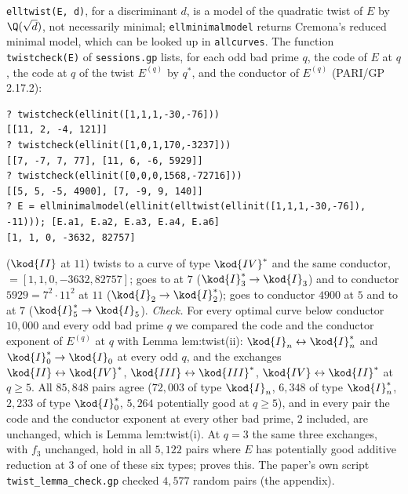 \begin{sloppypar}
\begin{example}\label{ex:computation:twists}
\texttt{elltwist(E, d)}, for a discriminant $d$, is a model of the quadratic twist of $E$ by $\Q(\sqrt d)$, not necessarily minimal;
\texttt{ellminimalmodel} returns Cremona's reduced minimal model, which can be looked up in \texttt{allcurves}. The function
\texttt{twistcheck(E)} of \texttt{sessions.gp} lists, for each odd bad prime $q$, the code of $E$ at $q$, the code at $q$ of the twist $E^{(q)}$ by
$q^*$, and the conductor of $E^{(q)}$ (PARI/GP 2.17.2):
\begin{lstlisting}[language=GP]
? twistcheck(ellinit([1,1,1,-30,-76]))
[[11, 2, -4, 121]]
? twistcheck(ellinit([1,0,1,170,-3237]))
[[7, -7, 7, 77], [11, 6, -6, 5929]]
? twistcheck(ellinit([0,0,0,1568,-72716]))
[[5, 5, -5, 4900], [7, -9, 9, 140]]
? E = ellminimalmodel(ellinit(elltwist(ellinit([1,1,1,-30,-76]), -11))); [E.a1, E.a2, E.a3, E.a4, E.a6]
[1, 1, 0, -3632, 82757]
\end{lstlisting}
 ($\kod{II}$ at $11$) twists to a curve of type $\kod{IV}^*$ and the same conductor,  $=[1,1,0,-3632,82757]$;  goes to
 at $7$ ($\kod{I}_3^*\to\kod{I}_3$) and to conductor $5929=7^2\cdot11^2$ at $11$ ($\kod{I}_2\to\kod{I}_2^*$);  goes to conductor $4900$ at $5$ and to
 at $7$ ($\kod{I}_5^*\to\kod{I}_5$). \emph{Check.} For every optimal curve below conductor $10{,}000$ and every odd bad prime $q$ we compared the code and the
conductor exponent of $E^{(q)}$ at $q$ with Lemma lem:twist(ii): $\kod{I}_n\leftrightarrow\kod{I}_n^*$ and $\kod{I}_0^*\to\kod{I}_0$ at every odd $q$, and the exchanges
$\kod{II}\leftrightarrow\kod{IV}^*$, $\kod{III}\leftrightarrow\kod{III}^*$, $\kod{IV}\leftrightarrow\kod{II}^*$ at $q\ge5$. All $85{,}848$ pairs agree ($72{,}003$ of type
$\kod{I}_n$, $6{,}348$ of type $\kod{I}_n^*$, $2{,}233$ of type $\kod{I}_0^*$, $5{,}264$ potentially good at $q\ge5$), and in every pair the code and the conductor
exponent at every other bad prime, $2$ included, are unchanged, which is Lemma lem:twist(i). At $q=3$ the same three exchanges, with $f_3$
unchanged, hold in all $5{,}122$ pairs where $E$ has potentially good additive reduction at $3$ of one of these six types; 
proves this. The paper's own script \texttt{twist\_lemma\_check.gp} checked $4{,}577$ random pairs (the appendix).
\end{example}


\end{sloppypar}
